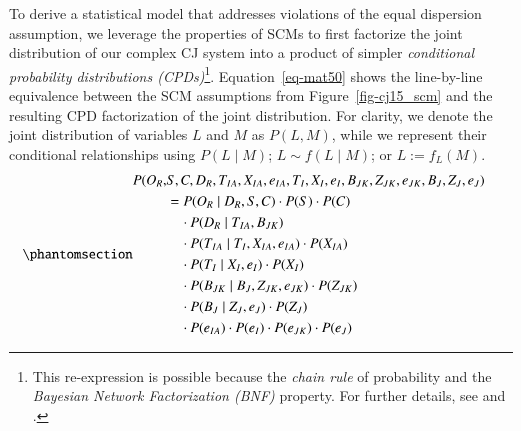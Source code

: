 \documentclass[
  authoryear,
  review,
  1p]{elsarticle}
\begin{document}
To derive a statistical model that addresses violations of the equal
dispersion assumption, we leverage the properties of SCMs to first
factorize the joint distribution of our complex CJ system into a product
of simpler \emph{conditional probability distributions
(CPDs)}\footnote{This re-expression is possible because the \emph{chain
  rule} of probability and the \emph{Bayesian Network Factorization
  (BNF)} property. For further details, see \citet{Pearl_et_al_2016} and
  \citet{Neal_2020}.}. Equation~\ref{eq-mat50} shows the line-by-line
equivalence between the SCM assumptions from Figure~\ref{fig-cj15_scm}
and the resulting CPD factorization of the joint distribution. For
clarity, we denote the joint distribution of variables \(L\) and \(M\)
as \(P(L, M)\), while we represent their conditional relationships using
\(P(L \mid M)\); \(L \sim f(L \mid M)\); or \(L := f_{L}(M)\).
\begin{equation}\protect\phantomsection\label{eq-mat50}{
\begin{aligned}
  P(O_{R}, & S, C, D_{R}, T_{IA}, X_{IA}, e_{IA}, T_{I}, X_{I}, e_{I}, B_{JK}, Z_{JK}, e_{JK}, B_{J}, Z_{J}, e_{J} ) & \\
  &= P(O_{R} \mid D_{R}, S, C) \cdot P(S) \cdot P(C) \\
  & \quad \cdot P(D_{R} \mid T_{IA}, B_{JK}) \\
  & \quad \cdot P(T_{IA} \mid T_{I}, X_{IA}, e_{IA}) \cdot P(X_{IA}) \\
  & \quad \cdot P(T_{I} \mid X_{I}, e_{I}) \cdot P(X_{I}) \\
  & \quad \cdot P(B_{JK} \mid B_{J}, Z_{JK}, e_{JK}) \cdot P(Z_{JK}) \\
  & \quad \cdot P(B_{J} \mid Z_{J}, e_{J}) \cdot P(Z_{J}) \\
  & \quad \cdot P(e_{IA}) \cdot P(e_{I}) \cdot P(e_{JK}) \cdot P(e_{J})  
\end{aligned}
}\end{equation}
\end{document}
